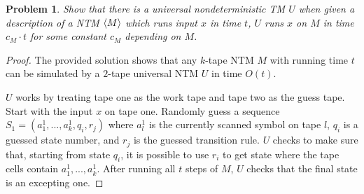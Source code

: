\documentclass[11pt]{article}
\newtheorem{problem}{Problem}
\DeclarePairedDelimiter\anglebrac{\langle}{\rangle}
\begin{document}
\begin{problem}
Show that there is a universal \emph{nondeterministic} TM $U$ when given a description of a NTM $\anglebrac{M}$ which runs input $x$ in time $t$, $U$ runs $x$ on $M$ in time $c_M \cdot t$ for some constant $c_M$ depending on $M$. 
\end{problem}
\begin{proof}
The provided solution shows that any $k$-tape NTM $M$ with running time $t$ can be simulated by a $2$-tape universal NTM $U$ in time $O(t)$. 

$U$ works by treating tape one as the work tape and tape two as the guess tape. Start with the input $x$ on tape one. Randomly guess a sequence $S_1 = (a^1_1, ..., a^1_k, q_i, r_j)$ where $a^1_l$ is the currently scanned symbol on tape $l$, $q_i$ is a guessed state number, and $r_j$ is the guessed transition rule. $U$ checks to make sure that, starting from state $q_i$, it is possible to use $r_i$ to get state where the tape cells contain $a^1_1, ..., a^1_k$. After running all $t$ steps of $M$, $U$ checks that the final state is an excepting one. 
\end{proof}
\end{document}
